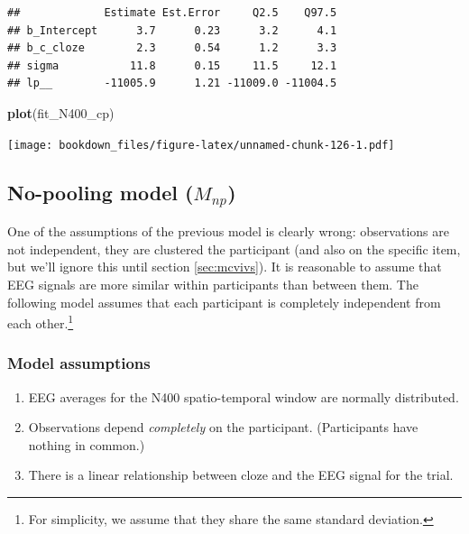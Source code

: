 \documentclass[12pt,]{krantz}
\newenvironment{Shaded}{\begin{snugshade}}{\end{snugshade}}
\newcommand{\KeywordTok}[1]{\textcolor[rgb]{0.13,0.29,0.53}{\textbf{#1}}}
\newcommand{\NormalTok}[1]{#1}
\providecommand{\tightlist}{%
  \setlength{\itemsep}{0pt}\setlength{\parskip}{0pt}}
\theoremstyle{definition}
\theoremstyle{definition}
\theoremstyle{definition}
\theoremstyle{remark}
\begin{document}
\begin{verbatim}
##             Estimate Est.Error     Q2.5    Q97.5
## b_Intercept      3.7      0.23      3.2      4.1
## b_c_cloze        2.3      0.54      1.2      3.3
## sigma           11.8      0.15     11.5     12.1
## lp__        -11005.9      1.21 -11009.0 -11004.5
\end{verbatim}

\begin{Shaded}
\begin{Highlighting}[]
\KeywordTok{plot}\NormalTok{(fit_N400_cp)}
\end{Highlighting}
\end{Shaded}

\texttt{[image: bookdown\_files/figure-latex/unnamed-chunk-126-1.pdf]}

\hypertarget{no-pooling-model-m_np}{%
\subsection{\texorpdfstring{No-pooling model (\(M_{np}\))}{No-pooling model (M\_\{np\})}}\label{no-pooling-model-m_np}}

One of the assumptions of the previous model is clearly wrong: observations are not independent, they are clustered the participant (and also on the specific item, but we'll ignore this until section \ref{sec:mcvivs}). It is reasonable to assume that EEG signals are more similar within participants than between them. The following model assumes that each participant is completely independent from each other.\footnote{For simplicity, we assume that they share the same standard deviation.}

\hypertarget{model-assumptions-1}{%
\subsubsection{Model assumptions}\label{model-assumptions-1}}

\begin{enumerate}
\def\labelenumi{\arabic{enumi}.}
\tightlist
\item
  EEG averages for the N400 spatio-temporal window are normally distributed.
\item
  Observations depend \emph{completely} on the participant. (Participants have nothing in common.)
\item
  There is a linear relationship between cloze and the EEG signal for the trial.
\end{enumerate}
\end{document}
